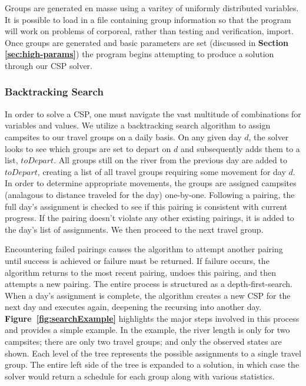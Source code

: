 \documentclass[11pt]{article} %
\begin{document}
Groups are generated en masse using a varitey of uniformly distributed
variables.  It is possible to load in a file containing group information
so that the program will work on problems of corporeal, rather than testing
and verification, import.  Once groups are generated and basic parameters
are set (discussed in \textbf{Section \ref{sec:high-params}}) the program begins
attempting to produce a solution through our CSP solver.

\subsubsection{Backtracking Search}
In order to solve a CSP, one must navigate the vast multitude of combinations
for variables and values. We utilize a backtracking search algorithm to
assign campsites to our travel groups on a daily basis.  On any given day
$d$, the solver looks to see which groups are set to depart on $d$ and
subsequently adds them to a list, $toDepart$.  All groups still on the
river from the previous day are added to $toDepart$, creating a list of all
travel groups requiring some movement for day $d$.  In order to determine
appropriate movements, the groups are assigned campsites (analagous to
distance traveled for the day) one-by-one.  Following
a pairing, the full day's assignment is checked to see if this pairing is
consistent with current progress.  If the pairing doesn't violate any other
existing pairings, it is added to the day's list of assignments.  We then
proceed to the next travel group.

Encountering failed pairings causes the algorithm to attempt another pairing
until success is achieved or failure must be returned.  If failure occurs,
the algorithm returns to the most recent pairing, undoes this pairing, and
then attempts a new pairing.  The entire process is structured as a
depth-first-search. When a day's assignment is complete, the algorithm creates
a new CSP for the next day and executes again, deepening the recursing into
another day.  \textbf{Figure~\ref{fig:searchExample}} highlights the major steps
involved in this process and provides a simple example.  In the example,
the river length is only for two campsites; there are only two travel groups;
and only the observed states are shown.  Each level of the tree represents
the possible assignments to a single travel group.  The entire left side
of the tree is expanded to a solution, in which case the solver would return
a schedule for each group along with various statistics.
\end{document}
